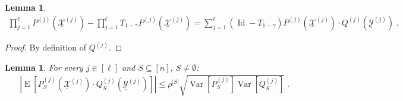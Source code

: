 \documentclass{daj}
\newcommand{\1}{\mathbbm{1}}
\theoremstyle{plain}
\newtheorem{lemma}[theorem]{Lemma}
\theoremstyle{definition}
\DeclareMathOperator*{\EE}{E}
\DeclareMathOperator*{\Var}{Var}
\DeclareMathOperator{\Id}{Id}
\begin{document}
\begin{lemma}
\label{lem:smooth-step-decomposition}
\begin{align*}
  \prod_{j=1}^\ell P^{(j)}(\underline{\mathcal{X}}^{(j)})
  - \prod_{j=1}^\ell T_{1-\gamma}P^{(j)}(\underline{\mathcal{X}}^{(j)})
  = \sum_{j=1}^{\ell}
  (\Id-T_{1-\gamma})P^{(j)}(\underline{\mathcal{X}}^{(j)}) \cdot
  Q^{(j)}(\underline{\mathcal{Y}}^{(j)})
  \; .
\end{align*}
\end{lemma}

\begin{proof}
By definition of $Q^{(j)}$.
\end{proof}

\begin{lemma}
\label{lem:decomposition-rho-bound}
For every $j \in [\ell]$ and $S \subseteq [n]$, $S \ne \emptyset$:
\begin{align*}
\left|\EE\left[ P_S^{(j)}(\underline{\mathcal{X}}^{(j)}) \cdot
Q_S^{(j)}(\underline{\mathcal{Y}}^{(j)}) \right] \right| \le 
\rho^{|S|} \sqrt{\Var[P_S^{(j)}] \Var[Q_S^{(j)}]}  \; .
\end{align*}
\end{lemma}
\end{document}
